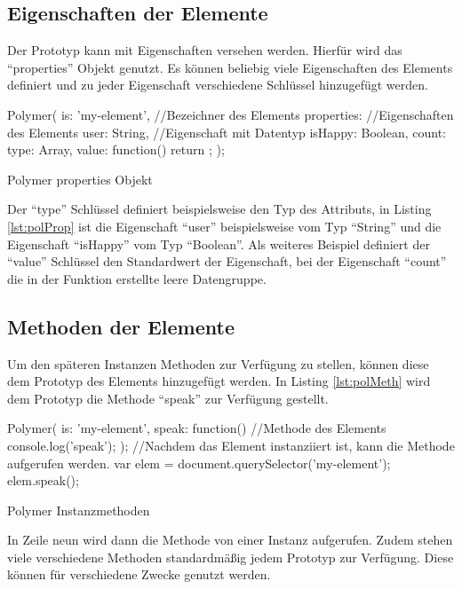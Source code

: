 \documentclass[12pt, paper=a4, bibtotoc, toc=listof, headsepline=true, numbers=endperiod]{scrreprt}
\begin{document}
\subsection{Eigenschaften der Elemente}
Der Prototyp kann mit Eigenschaften versehen werden. Hierfür wird das \enquote{properties} Objekt genutzt. Es können beliebig viele Eigenschaften des Elements definiert und zu jeder Eigenschaft verschiedene Schlüssel hinzugefügt werden.
\begin{listing}[H]
	\begin{JavaScriptcode*}{}
Polymer({
   is: 'my-element', //Bezeichner des Elements
   properties: {  //Eigenschaften des Elements
      user: String, //Eigenschaft mit Datentyp
      isHappy: Boolean,
      count: {
         type: Array,
         value: function() { return {}; }
      }
   }
});
	\end{JavaScriptcode*}
	\caption{Polymer properties Objekt}
	\label{lst:polProp}
\end{listing}
Der \enquote{type} Schlüssel definiert beispielsweise den Typ des Attributs, in Listing \ref{lst:polProp} ist die Eigenschaft \enquote{user} beispielsweise vom Typ \enquote{String} und die Eigenschaft \enquote{isHappy} vom Typ \enquote{Boolean}. Als weiteres Beispiel definiert der \enquote{value} Schlüssel den Standardwert der Eigenschaft, bei der Eigenschaft \enquote{count} die in der Funktion erstellte leere Datengruppe\cite{polyProp}.
\subsection{Methoden der Elemente}
Um den späteren Instanzen Methoden zur Verfügung zu stellen, können diese dem Prototyp des Elements hinzugefügt werden. In Listing \ref{lst:polMeth} wird dem Prototyp die Methode \enquote{speak} zur Verfügung gestellt.
\begin{listing}
	\begin{JavaScriptcode*}{}
Polymer({
   is: 'my-element',
   speak: function(){  //Methode des Elements
   console.log('speak');
   }
});
//Nachdem das Element instanziiert ist, kann die Methode aufgerufen werden.
var elem = document.querySelector('my-element');
elem.speak();
	\end{JavaScriptcode*}
	\caption{Polymer Instanzmethoden}
	\label{lst:polMeth}
\end{listing} In Zeile neun wird dann die Methode von einer Instanz aufgerufen. Zudem stehen viele verschiedene Methoden standardmäßig jedem Prototyp zur Verfügung. Diese können für verschiedene Zwecke genutzt werden\cite{polyInstMeth}.
\end{document}
